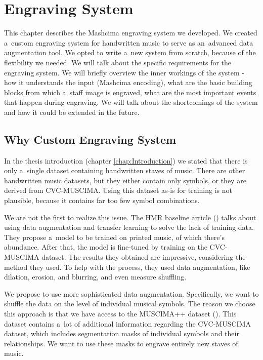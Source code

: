 \chapter{Engraving System}
\label{chap:EngravingSystem}

This chapter describes the Mashcima engraving system we developed. We created a~custom engraving system for handwritten music to serve as an~advanced data augmentation tool. We opted to write a~new system from scratch, because of the flexibility we needed. We will talk about the specific requirements for the engraving system. We will briefly overview the inner workings of the system - how it understands the input (Mashcima encoding), what are the basic building blocks from which a~staff image is engraved, what are the most important events that happen during engraving. We will talk about the shortcomings of the system and how it could be extended in the future.


\section{Why Custom Engraving System}

In the thesis introduction (chapter \ref{chap:Introduction}) we stated that there is only a~single dataset containing handwritten staves of music. There are other handwritten music datasets, but they either contain only symbols, or they are derived from CVC-MUSCIMA. Using this dataset as-is for training is not plausible, because it contains far too few symbol combinations.

We are not the first to realize this issue. The HMR baseline article (\cite{HmrBaseline}) talks about using data augmentation and transfer learning to solve the lack of training data. They propose a~model to be trained on printed music, of which there's abundance. After that, the model is fine-tuned by training on the CVC-MUSCIMA dataset. The results they obtained are impressive, considering the method they used. To help with the process, they used data augmentation, like dilation, erosion, and blurring, and even measure shuffling.

We propose to use more sophisticated data augmentation. Specifically, we want to shuffle the data on the level of individual musical symbols. The reason we choose this approach is that we have access to the MUSCIMA++ dataset (\cite{MuscimaPP}). This dataset contains a~lot of additional information regarding the CVC-MUSCIMA dataset, which includes segmentation masks of individual symbols and their relationships. We want to use these masks to engrave entirely new staves of music.

